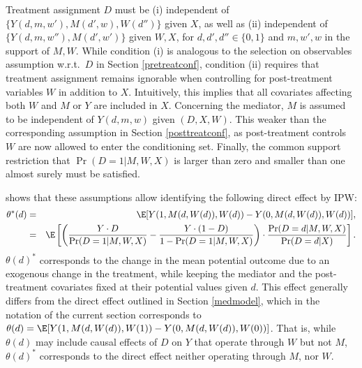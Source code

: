 \documentclass[nojss]{jss}
\begin{document}
Treatment assignment $D$ must be (i) independent of $\{Y(d,m,w'), M(d',w), W(d'')\}$  given $X$, as well as (ii) independent of $\{Y(d,m,w''),  M(d',w')\}$  given $W,X$, for $d,d',d'' \in \{0,1\}$ and $m,w',w$ in the support of $M,W$. While condition (i) is analogous to the selection on observables assumption w.r.t.\ $D$ in Section \ref{pretreatconf}, condition (ii) requires that treatment assignment remains ignorable when controlling for post-treatment variables $W$ in addition to $X$. Intuitively, this implies that all covariates affecting both $W$ and $M$ or $Y$ are included in $X$. Concerning the mediator, $M$ is  assumed to be independent of $Y(d,m, w)$  given $(D,X,W)$. This weaker than the corresponding assumption in Section \ref{posttreatconf}, as post-treatment controls $W$ are now allowed to enter the conditioning set. Finally, the common support restriction that $\Pr(D=1| M, W,X)$ is larger than zero and smaller than one almost surely must be satisfied.

\citet{Hu2014} shows that these assumptions allow identifying the following direct effect by IPW:
\begin{eqnarray}\label{dir.x}
\theta^*(d) &=& \E[Y(1,M(d,W(d)),W(d))-Y(0,M(d,W(d)),W(d))],\\
&=&\E\left[ \left( \frac{Y\cdot D}{\Pr (D=1|M,W,X)}-\frac{Y\cdot (1-D)}{%
  1-\Pr (D=1|M,W,X)}\right) \cdot \frac{\Pr (D=d|M,W,X)}{\Pr (D=d|X)}\right].\notag
\end{eqnarray}
$\theta(d)^*$ corresponds to the change in the mean potential outcome due to an exogenous change in the treatment, while keeping the mediator and the post-treatment covariates fixed at their potential values given $d$. This effect generally differs from the direct effect outlined in Section \ref{medmodel}, which in the notation of the current section corresponds to  $\theta(d)=\E[Y(1,M(d,W(d)),W(1))-Y(0,M(d,W(d)),W(0))]$. That is, while $\theta(d)$ may include causal effects of $D$ on $Y$ that operate through $W$ but not $M$, $\theta(d)^*$ corresponds to the direct effect neither operating through $M$, nor $W$.
\end{document}
